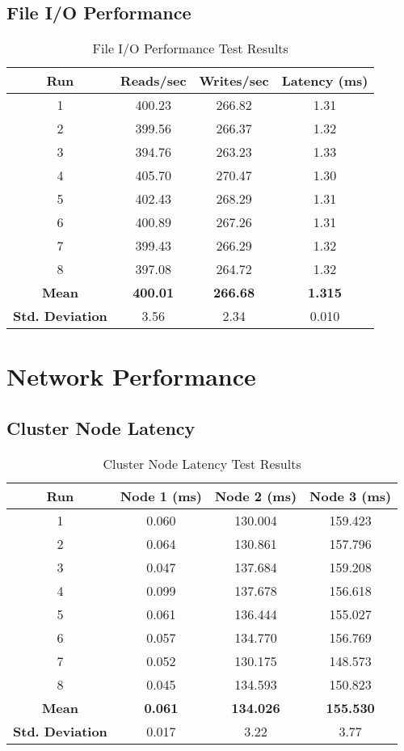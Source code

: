 \subsection{File I/O Performance}
\begin{table}[H]
\centering
\begin{tabular}{|c|c|c|c|}
\hline
\textbf{Run} & \textbf{Reads/sec} & \textbf{Writes/sec} & \textbf{Latency (ms)} \\
\hline
1 & 400.23 & 266.82 & 1.31 \\
2 & 399.56 & 266.37 & 1.32 \\
3 & 394.76 & 263.23 & 1.33 \\
4 & 405.70 & 270.47 & 1.30 \\
5 & 402.43 & 268.29 & 1.31 \\
6 & 400.89 & 267.26 & 1.31 \\
7 & 399.43 & 266.29 & 1.32 \\
8 & 397.08 & 264.72 & 1.32 \\
\hline
\textbf{Mean} & \textbf{400.01} & \textbf{266.68} & \textbf{1.315} \\
\textbf{Std. Deviation} & 3.56 & 2.34 & 0.010 \\
\hline
\end{tabular}
\caption{File I/O Performance Test Results}
\end{table}

\section{Network Performance}

\subsection{Cluster Node Latency}
\begin{table}[H]
\centering
\begin{tabular}{|c|c|c|c|}
\hline
\textbf{Run} & \textbf{Node 1 (ms)} & \textbf{Node 2 (ms)} & \textbf{Node 3 (ms)} \\
\hline
1 & 0.060 & 130.004 & 159.423 \\
2 & 0.064 & 130.861 & 157.796 \\
3 & 0.047 & 137.684 & 159.208 \\
4 & 0.099 & 137.678 & 156.618 \\
5 & 0.061 & 136.444 & 155.027 \\
6 & 0.057 & 134.770 & 156.769 \\
7 & 0.052 & 130.175 & 148.573 \\
8 & 0.045 & 134.593 & 150.823 \\
\hline
\textbf{Mean} & \textbf{0.061} & \textbf{134.026} & \textbf{155.530} \\
\textbf{Std. Deviation} & 0.017 & 3.22 & 3.77 \\
\hline
\end{tabular}
\caption{Cluster Node Latency Test Results}
\end{table}

